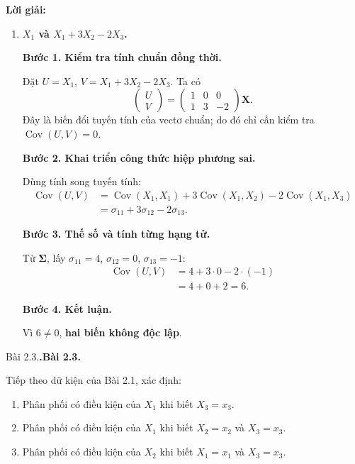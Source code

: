 \documentclass[11pt,a4paper]{article}
\makeatletter
\renewcommand{\boldsymbol}[1]{\symbf{#1}}
\newcounter{prob}
\newenvironment{problem}[1][]{%
  \par\medskip\noindent
  \def\@tempa{#1}%
  \ifx\@tempa\@empty\refstepcounter{prob}\textbf{\theprob.}\else\textbf{#1}\fi
  \ \ignorespaces
}{\par}
\newenvironment{solution}{%
  \par\medskip\noindent\textbf{Lời giải:}\par\nopagebreak[4]\smallskip\noindent\ignorespaces
}{\par}
\newcommand{\step}[2]{\par\medskip\noindent\textbf{Bước #1. #2}\par\nopagebreak[4]\smallskip\noindent}
\makeatother
\begin{document}
\begin{solution}
\begin{enumerate}[label=\textbf{\alph*)}]
\step{2}{Tính từng phần tử của khối.}
\begin{align*}
\operatorname{Cov}(X_1,V)&=\sigma_{12}=0,\\
\operatorname{Cov}(X_3,V)&=\sigma_{32}=0.
\end{align*}
Do đó
\[
\operatorname{Cov}(\mathbf{U},V)
=\begin{pmatrix}\sigma_{12}\\\sigma_{32}\end{pmatrix}
=\begin{pmatrix}0\\0\end{pmatrix}.
\]
\step{3}{Kết luận.}
Toàn bộ khối hiệp phương sai chéo bằng không, nên
\textbf{$(X_1,X_3)'$ và $X_2$ độc lập}.
\item \textbf{$X_1$ và $X_1+3X_2-2X_3$.}\par\nopagebreak[4]
\step{1}{Kiểm tra tính chuẩn đồng thời.}
Đặt $U=X_1$, $V=X_1+3X_2-2X_3$. Ta có
\[
\begin{pmatrix}U\\V\end{pmatrix}
=\begin{pmatrix}1&0&0\\1&3&-2\end{pmatrix}\mathbf{X}.
\]
Đây là biến đổi tuyến tính của vectơ chuẩn; do đó chỉ cần kiểm tra
$\operatorname{Cov}(U,V)=0$.
\step{2}{Khai triển công thức hiệp phương sai.}
Dùng tính song tuyến tính:
\begin{align*}
\operatorname{Cov}(U,V)
&=\operatorname{Cov}(X_1,X_1)
 +3\operatorname{Cov}(X_1,X_2)-2\operatorname{Cov}(X_1,X_3)\\
&=\sigma_{11}+3\sigma_{12}-2\sigma_{13}.
\end{align*}
\step{3}{Thế số và tính từng hạng tử.}
Từ $\boldsymbol{\Sigma}$, lấy $\sigma_{11}=4$, $\sigma_{12}=0$, $\sigma_{13}=-1$:
\begin{align*}
\operatorname{Cov}(U,V)&=4+3\cdot0-2\cdot(-1)\\
&=4+0+2=6.
\end{align*}
\step{4}{Kết luận.}
Vì $6\ne0$, \textbf{hai biến không độc lập}.
\end{enumerate}
\end{solution}

\begin{problem}[Bài 2.3.]
Tiếp theo dữ kiện của Bài 2.1, xác định:
\begin{enumerate}[label=\alph*)]
  \item Phân phối có điều kiện của $X_1$ khi biết $X_3 = x_3$.
  \item Phân phối có điều kiện của $X_1$ khi biết $X_2 = x_2$ và $X_3 = x_3$.
  \item Phân phối có điều kiện của $X_2$ khi biết $X_1 = x_1$ và $X_3 = x_3$.
\end{enumerate}
\end{problem}
\end{document}
